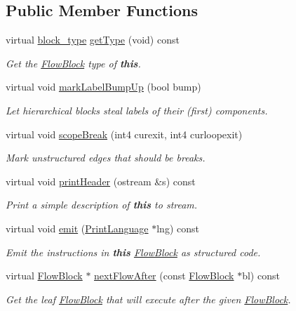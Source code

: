 \subsection*{Public Member Functions}
\begin{DoxyCompactItemize}
\item 
virtual \mbox{\hyperlink{class_flow_block_a70df78390870fcdd51e31426ba6a193e}{block\+\_\+type}} \mbox{\hyperlink{class_block_do_while_a3700fcac8afffc121249a49af054269e}{get\+Type}} (void) const
\begin{DoxyCompactList}\small\item\em Get the \mbox{\hyperlink{class_flow_block}{Flow\+Block}} type of {\bfseries{this}}. \end{DoxyCompactList}\item 
virtual void \mbox{\hyperlink{class_block_do_while_ab391ccd9276eec9200396ea6e8db7a96}{mark\+Label\+Bump\+Up}} (bool bump)
\begin{DoxyCompactList}\small\item\em Let hierarchical blocks steal labels of their (first) components. \end{DoxyCompactList}\item 
virtual void \mbox{\hyperlink{class_block_do_while_a6a6254c0020641ccffd791f6206461cc}{scope\+Break}} (int4 curexit, int4 curloopexit)
\begin{DoxyCompactList}\small\item\em Mark unstructured edges that should be {\itshape breaks}. \end{DoxyCompactList}\item 
virtual void \mbox{\hyperlink{class_block_do_while_a95baa39da580d08f36b507fefe61823f}{print\+Header}} (ostream \&s) const
\begin{DoxyCompactList}\small\item\em Print a simple description of {\bfseries{this}} to stream. \end{DoxyCompactList}\item 
virtual void \mbox{\hyperlink{class_block_do_while_aa3ab4da82b72f8de35ad9de5f5dff9a2}{emit}} (\mbox{\hyperlink{class_print_language}{Print\+Language}} $\ast$lng) const
\begin{DoxyCompactList}\small\item\em Emit the instructions in {\bfseries{this}} \mbox{\hyperlink{class_flow_block}{Flow\+Block}} as structured code. \end{DoxyCompactList}\item 
virtual \mbox{\hyperlink{class_flow_block}{Flow\+Block}} $\ast$ \mbox{\hyperlink{class_block_do_while_a996ef387d4f6d645c38544d2aa4ba438}{next\+Flow\+After}} (const \mbox{\hyperlink{class_flow_block}{Flow\+Block}} $\ast$bl) const
\begin{DoxyCompactList}\small\item\em Get the leaf \mbox{\hyperlink{class_flow_block}{Flow\+Block}} that will execute after the given \mbox{\hyperlink{class_flow_block}{Flow\+Block}}. \end{DoxyCompactList}\end{DoxyCompactItemize}
